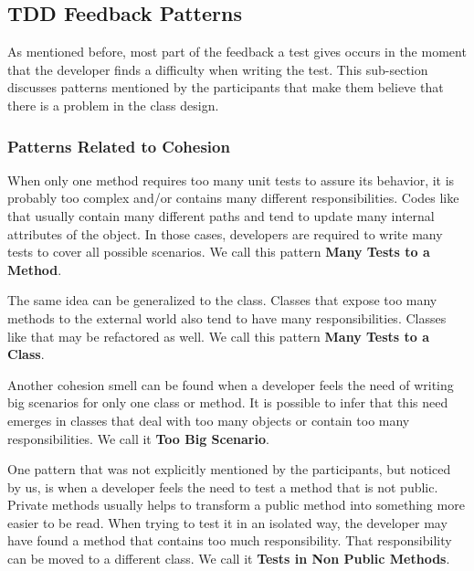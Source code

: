 \documentclass[times]{speauth}
\begin{document}
\subsection{TDD Feedback Patterns}
\label{padroes-tdd}

As mentioned before, most part of the feedback a test gives occurs in the moment
that the developer finds a difficulty when writing the test. This sub-section discusses
patterns mentioned by the participants that make them believe that there is a
problem in the class design.

\subsubsection{Patterns Related to Cohesion}

When only one method requires too many unit tests to assure its behavior,
it is probably too complex and/or contains many different responsibilities.
Codes like that usually contain many different paths and tend to update
many internal attributes of the object. In those cases, developers
are required to write many tests to cover all possible scenarios.
We call this pattern \textbf{Many Tests to a Method}.

The same idea can be generalized to the class. Classes that expose too 
many methods to the external world also tend to have many responsibilities.
Classes like that may be refactored as well.
We call this pattern \textbf{Many Tests to a Class}.

Another cohesion smell can be found when a developer feels the need
of writing big scenarios for only one class or method. It is possible to infer
that this need emerges in classes that deal with too many objects or
contain too many responsibilities. We call it \textbf{Too Big Scenario}.

One pattern that was not explicitly mentioned by the participants, but
noticed by us, is when a developer feels the need to test a method
that is not public. Private methods usually helps to transform a public method
into something more easier to be read. When trying to test it in an isolated
way, the developer may have found a method that contains too much responsibility.
That responsibility can be moved to a different class. We call it \textbf{Tests in Non Public Methods}.

\end{document}
